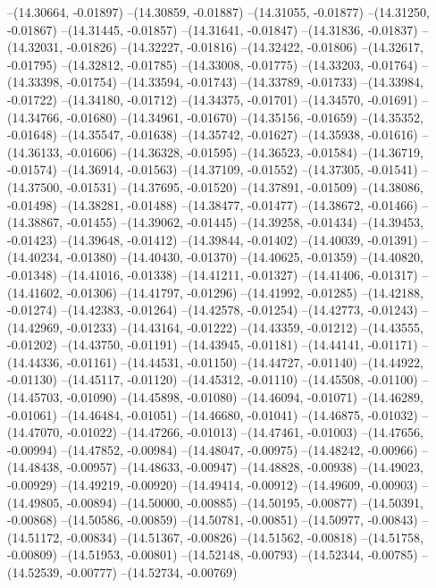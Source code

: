 --(14.30664, -0.01897)
--(14.30859, -0.01887)
--(14.31055, -0.01877)
--(14.31250, -0.01867)
--(14.31445, -0.01857)
--(14.31641, -0.01847)
--(14.31836, -0.01837)
--(14.32031, -0.01826)
--(14.32227, -0.01816)
--(14.32422, -0.01806)
--(14.32617, -0.01795)
--(14.32812, -0.01785)
--(14.33008, -0.01775)
--(14.33203, -0.01764)
--(14.33398, -0.01754)
--(14.33594, -0.01743)
--(14.33789, -0.01733)
--(14.33984, -0.01722)
--(14.34180, -0.01712)
--(14.34375, -0.01701)
--(14.34570, -0.01691)
--(14.34766, -0.01680)
--(14.34961, -0.01670)
--(14.35156, -0.01659)
--(14.35352, -0.01648)
--(14.35547, -0.01638)
--(14.35742, -0.01627)
--(14.35938, -0.01616)
--(14.36133, -0.01606)
--(14.36328, -0.01595)
--(14.36523, -0.01584)
--(14.36719, -0.01574)
--(14.36914, -0.01563)
--(14.37109, -0.01552)
--(14.37305, -0.01541)
--(14.37500, -0.01531)
--(14.37695, -0.01520)
--(14.37891, -0.01509)
--(14.38086, -0.01498)
--(14.38281, -0.01488)
--(14.38477, -0.01477)
--(14.38672, -0.01466)
--(14.38867, -0.01455)
--(14.39062, -0.01445)
--(14.39258, -0.01434)
--(14.39453, -0.01423)
--(14.39648, -0.01412)
--(14.39844, -0.01402)
--(14.40039, -0.01391)
--(14.40234, -0.01380)
--(14.40430, -0.01370)
--(14.40625, -0.01359)
--(14.40820, -0.01348)
--(14.41016, -0.01338)
--(14.41211, -0.01327)
--(14.41406, -0.01317)
--(14.41602, -0.01306)
--(14.41797, -0.01296)
--(14.41992, -0.01285)
--(14.42188, -0.01274)
--(14.42383, -0.01264)
--(14.42578, -0.01254)
--(14.42773, -0.01243)
--(14.42969, -0.01233)
--(14.43164, -0.01222)
--(14.43359, -0.01212)
--(14.43555, -0.01202)
--(14.43750, -0.01191)
--(14.43945, -0.01181)
--(14.44141, -0.01171)
--(14.44336, -0.01161)
--(14.44531, -0.01150)
--(14.44727, -0.01140)
--(14.44922, -0.01130)
--(14.45117, -0.01120)
--(14.45312, -0.01110)
--(14.45508, -0.01100)
--(14.45703, -0.01090)
--(14.45898, -0.01080)
--(14.46094, -0.01071)
--(14.46289, -0.01061)
--(14.46484, -0.01051)
--(14.46680, -0.01041)
--(14.46875, -0.01032)
--(14.47070, -0.01022)
--(14.47266, -0.01013)
--(14.47461, -0.01003)
--(14.47656, -0.00994)
--(14.47852, -0.00984)
--(14.48047, -0.00975)
--(14.48242, -0.00966)
--(14.48438, -0.00957)
--(14.48633, -0.00947)
--(14.48828, -0.00938)
--(14.49023, -0.00929)
--(14.49219, -0.00920)
--(14.49414, -0.00912)
--(14.49609, -0.00903)
--(14.49805, -0.00894)
--(14.50000, -0.00885)
--(14.50195, -0.00877)
--(14.50391, -0.00868)
--(14.50586, -0.00859)
--(14.50781, -0.00851)
--(14.50977, -0.00843)
--(14.51172, -0.00834)
--(14.51367, -0.00826)
--(14.51562, -0.00818)
--(14.51758, -0.00809)
--(14.51953, -0.00801)
--(14.52148, -0.00793)
--(14.52344, -0.00785)
--(14.52539, -0.00777)
--(14.52734, -0.00769)
